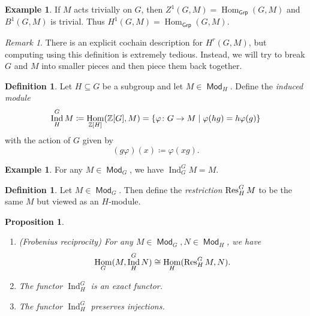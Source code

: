 \documentclass[leqno, openany]{memoir}
\newtheorem{prop}[thm]{Proposition}
\theoremstyle{definition}
\newtheorem{defn}[thm]{Definition}
\newtheorem{exm}[thm]{Example}
\theoremstyle{remark}
\newtheorem{rmk}[thm]{Remark}
\theoremstyle{plain}
\theoremstyle{definition}
\theoremstyle{remark}
\newcommand{\Z}{\mathbb{Z}}
\newcommand{\ms}[1]{\mathsf{#1}}
\DeclareMathOperator{\Hom}{Hom}
\DeclareMathOperator{\Mod}{\mathsf{Mod}}
\DeclareMathOperator{\Ind}{Ind}
\begin{document}
\begin{exm}
    If $M$ acts trivially on $G$, then $Z^1(G, M) = \Hom_{\ms{Grp}}(G, M)$ and $B^1(G, M)$ is trivial. Thus $H^1(G, M) = \Hom_{\ms{Grp}}(G, M)$.
\end{exm}

\begin{rmk}
    There is an explicit cochain description for $H^r(G, M)$, but computing using this definition is extremely tedious. Instead, we will try to break $G$ and $M$ into smaller pieces and then piece them back together.
\end{rmk}

\begin{defn}
    Let $H \subseteq G$ be a subgroup and let $M \in \Mod_H$. Define the \textit{induced module}
    \[ \Ind_H^G M \coloneqq \Hom_{\Z[H]} (\Z[G], M) = \qty{\varphi \colon G \to M \mid \varphi(hg) = h \varphi(g)} \]
    with the action of $G$ given by
    \[ (g \varphi)(x) \coloneqq \varphi(xg). \]
\end{defn}

\begin{exm}
    For any $M \in \Mod_G$, we have $\Ind_G^G M = M$.
\end{exm}

\begin{defn}
    Let $M \in \Mod_G$. Then define the \textit{restriction} $\Res_H^G M$ to be the same $M$ but viewed as an $H$-module. 
\end{defn}

\begin{prop}\leavevmode
    \begin{enumerate}
        \item (Frobenius reciprocity) For any $M \in \Mod_G, N \in \Mod_H$, we have
            \[ \Hom_G(M, \Ind_H^G N) \cong \Hom_H(\Res_H^G M, N). \]
        \item The functor $\Ind_H^G$ is an exact functor.
        \item The functor $\Ind_H^G$ preserves injections.
    \end{enumerate}
\end{prop}
\end{document}
